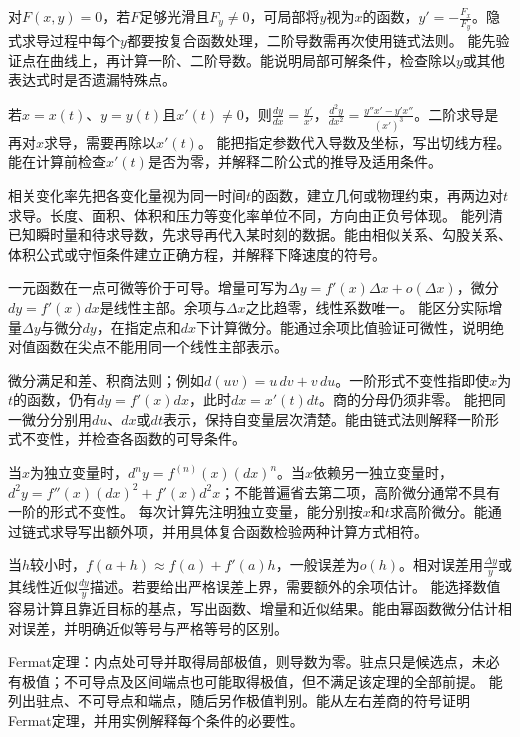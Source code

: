 {对$F(x,y)=0$，若$F$足够光滑且$F_y\ne0$，可局部将$y$视为$x$的函数，$y'=-\frac{F_x}{F_y}$。隐式求导过程中每个$y$都要按复合函数处理，二阶导数需再次使用链式法则。}
{能先验证点在曲线上，再计算一阶、二阶导数。能说明局部可解条件，检查除以$y$或其他表达式时是否遗漏特殊点。}

{若$x=x(t)$、$y=y(t)$且$x'(t)\ne0$，则$\frac{dy}{dx}=\frac{y'}{x'}$，$\frac{d^2y}{dx^2}=\frac{y''x'-y'x''}{(x')^3}$。二阶求导是再对$x$求导，需要再除以$x'(t)$。}
{能把指定参数代入导数及坐标，写出切线方程。能在计算前检查$x'(t)$是否为零，并解释二阶公式的推导及适用条件。}

{相关变化率先把各变化量视为同一时间$t$的函数，建立几何或物理约束，再两边对$t$求导。长度、面积、体积和压力等变化率单位不同，方向由正负号体现。}
{能列清已知瞬时量和待求导数，先求导再代入某时刻的数据。能由相似关系、勾股关系、体积公式或守恒条件建立正确方程，并解释下降速度的符号。}

{一元函数在一点可微等价于可导。增量可写为$\Delta y=f'(x)\Delta x+o(\Delta x)$，微分$dy=f'(x)dx$是线性主部。余项与$\Delta x$之比趋零，线性系数唯一。}
{能区分实际增量$\Delta y$与微分$dy$，在指定点和$dx$下计算微分。能通过余项比值验证可微性，说明绝对值函数在尖点不能用同一个线性主部表示。}

{微分满足和差、积商法则；例如$d(uv)=u\,dv+v\,du$。一阶形式不变性指即使$x$为$t$的函数，仍有$dy=f'(x)dx$，此时$dx=x'(t)dt$。商的分母仍须非零。}
{能把同一微分分别用$du$、$dx$或$dt$表示，保持自变量层次清楚。能由链式法则解释一阶形式不变性，并检查各函数的可导条件。}

{当$x$为独立变量时，$d^ny=f^{(n)}(x)(dx)^n$。当$x$依赖另一独立变量时，$d^2y=f''(x)(dx)^2+f'(x)d^2x$；不能普遍省去第二项，高阶微分通常不具有一阶的形式不变性。}
{每次计算先注明独立变量，能分别按$x$和$t$求高阶微分。能通过链式求导写出额外项，并用具体复合函数检验两种计算方式相符。}

{当$h$较小时，$f(a+h)\approx f(a)+f'(a)h$，一般误差为$o(h)$。相对误差用$\frac{\Delta y}{y}$或其线性近似$\frac{dy}{y}$描述。若要给出严格误差上界，需要额外的余项估计。}
{能选择数值容易计算且靠近目标的基点，写出函数、增量和近似结果。能由幂函数微分估计相对误差，并明确近似等号与严格等号的区别。}

{Fermat定理：内点处可导并取得局部极值，则导数为零。驻点只是候选点，未必有极值；不可导点及区间端点也可能取得极值，但不满足该定理的全部前提。}
{能列出驻点、不可导点和端点，随后另作极值判别。能从左右差商的符号证明Fermat定理，并用实例解释每个条件的必要性。}

